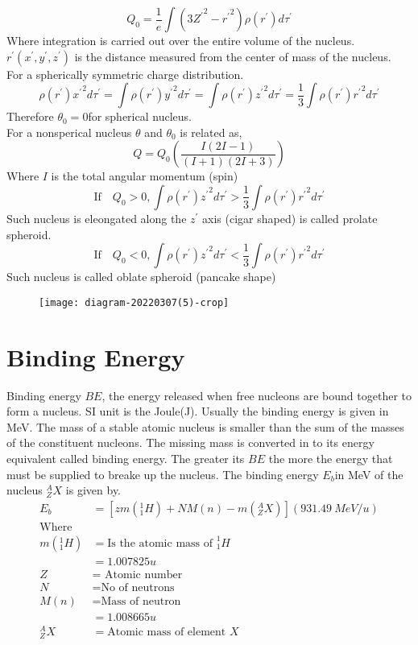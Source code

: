 \begin{enumerate}
$$Q_0=\frac{1}{e}\int(3{Z^\prime}^2-{r^\prime}^2)\rho(r^\prime)d\tau^\prime$$
Where integration is carried out over the entire volume of the nucleus. $r^\prime(x^\prime,y^\prime,z^\prime
)$ is the distance measured from the center of mass of the nucleus.\\
For a spherically symmetric charge distribution.
$$\rho(r^\prime){x^\prime}^2d\tau^\prime=\int \rho(r^\prime){y^\prime}^2d\tau^\prime=\int \rho(r^\prime){z^\prime}^2d\tau^\prime=\frac{1}{3}\int \rho(r^\prime){r^\prime}^2d\tau^\prime$$
Therefore $\theta_0=0$for spherical nucleus.\\
For a nonsperical nucleus $\theta$ and $\theta_0$ is related as,
$$Q=Q_0\left( \frac{I(2I-1)}{(I+1)(2I+3)}\right) $$
Where $I$ is the total angular momentum (spin)
$$\text{If}\quad Q_0>0, \int \rho(r^\prime){z^\prime}^2d\tau^\prime>\frac{1}{3}\int \rho(r^\prime){r^\prime}^2d\tau^\prime$$
Such nucleus is eleongated along the $z^\prime$ axis (cigar shaped) is called prolate spheroid.
$$\text{If}\quad Q_0<0, \int \rho(r^\prime){z^\prime}^2d\tau^\prime<\frac{1}{3}\int \rho(r^\prime){r^\prime}^2d\tau^\prime$$
Such nucleus is called oblate spheroid (pancake shape)
\begin{figure}[H]
	\centering
	\texttt{[image: diagram-20220307(5)-crop]}
	\caption{}
	\label{}
\end{figure}
\end{enumerate}
\section{Binding Energy}
Binding energy $BE$, the energy released when free nucleons are bound together to form a nucleus. SI unit is the Joule(J). Usually the binding energy is given in MeV. The mass of a stable atomic nucleus is smaller than the sum of the masses of the constituent nucleons. The missing mass is converted in to its energy equivalent called binding energy. The greater its $BE$ the more the energy that must be supplied to breake up the nucleus. The binding energy $E_b$in MeV  of the nucleus $^A_ZX$ is given by.
\begin{align*}
E_b&=\left[ zm(^1_1H)+NM(n)-m(^A_ZX)\right]\left(931.49\  MeV/u \right)  \\
\text{Where}\\
m(^1_1H)&=\text{Is the atomic mass of }^1_1H\\
&=1.007825 u\\
Z&= \text{ Atomic number}\\
N&= \text{No of neutrons}\\
M(n)&=\text{Mass of neutron}\\
&=1.008665 u\\
^A_ZX&= \text{Atomic mass of element }X
\end{align*}
